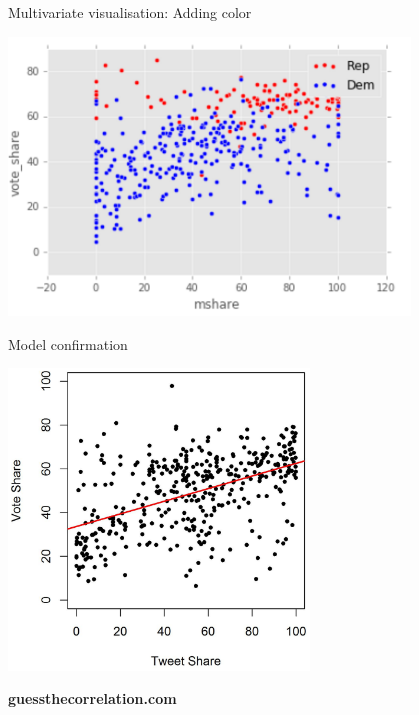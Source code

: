 \documentclass{beamer}
\begin{document}
\begin{frame}{Multivariate visualisation: Adding color}
    \begin{center}
        \includegraphics[width=0.8\textwidth]{img/mshare-voteshare-scatter-color.png}
    \end{center}
\end{frame}

\begin{frame}{Model confirmation}
    \begin{center}
        \includegraphics[width=0.6\textwidth]{img/DiGrazia-F2.png}
    \end{center}
\end{frame}

\begin{frame}[plain]
    \begin{center}
        \textbf{\LARGE guessthecorrelation.com}
    \end{center}
\end{frame}
\end{document}
